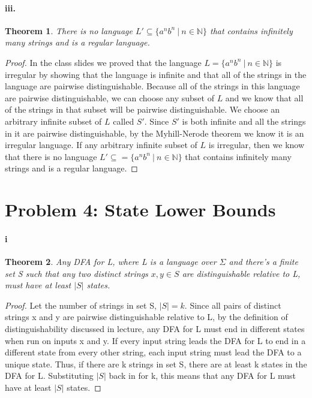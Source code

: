 \documentclass[10pt,letter]{article}
\newtheorem*{thm}{Theorem}
\begin{document}
\paragraph{iii.}
\begin{thm} There is no language $L' \subseteq  \{a^nb^n \ | \ n \in \mathbb{N} \}$ that contains infinitely many strings and is a regular language. \end{thm}
\begin{proof}
In the class slides we proved that the language $L = \{a^nb^n \ | \ n \in \mathbb{N} \}$ is irregular by showing that the language is infinite and that all of the strings in the language are pairwise distinguishable. Because all of the strings in this language are pairwise distinguishable, we can choose any subset of $L$ and we know that all of the strings in that subset will be pairwise distinguishable. We choose an arbitrary infinite subset of $L$ called $S'$. Since $S'$ is both infinite and all the strings in it are pairwise distinguishable, by the Myhill-Nerode theorem we know it is an irregular language. If any arbitrary infinite subset of $L$ is irregular, then we know that there is no language $L' \subseteq  = \{a^nb^n \ | \ n \in \mathbb{N} \}$ that contains infinitely many strings and is a regular language.
\end{proof}

\section*{Problem 4: State Lower Bounds}
\paragraph{i}
\begin{thm}Any DFA for L, where L is a language over $\Sigma$ and there's a finite set S such that any two distinct strings $x,y\in S$ are distinguishable relative to L, must have at least $|S|$ states. \end{thm}

\begin{proof} Let the number of strings in set S, $|S| = k$. Since all pairs of distinct strings x and y are pairwise distinguishable relative to L, by the definition of distinguishability discussed in lecture, any DFA for L must end in different states when run on inputs x and y. If every input string leads the DFA for L to end in a different state from every other string, each input string must lead the DFA to a unique state. Thus, if there are k strings in set S, there are at least k states in the DFA for L. Substituting $|S|$ back in for k, this means that any DFA for L must have at least $|S|$ states.
\end{proof}
\end{document}
